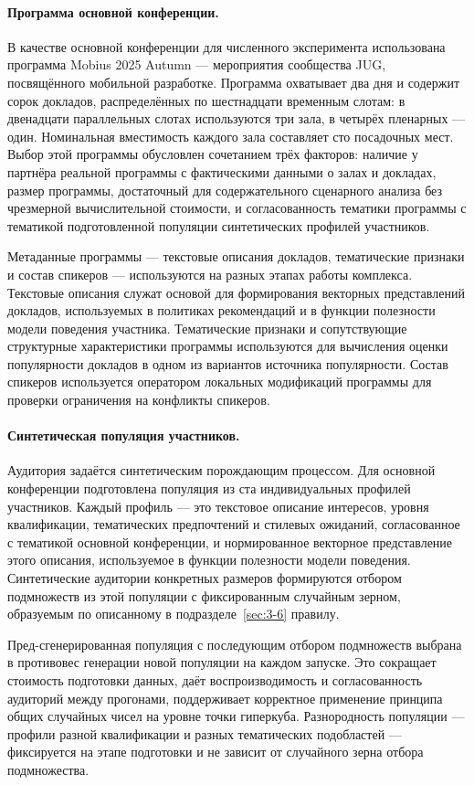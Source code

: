 \paragraph{Программа основной конференции.}
В качестве основной конференции для численного эксперимента использована программа Mobius 2025 Autumn --- мероприятия сообщества JUG, посвящённого мобильной разработке. Программа охватывает два дня и содержит сорок докладов, распределённых по шестнадцати временным слотам: в двенадцати параллельных слотах используются три зала, в четырёх пленарных --- один. Номинальная вместимость каждого зала составляет сто посадочных мест. Выбор этой программы обусловлен сочетанием трёх факторов: наличие у партнёра реальной программы с фактическими данными о залах и докладах, размер программы, достаточный для содержательного сценарного анализа без чрезмерной вычислительной стоимости, и согласованность тематики программы с тематикой подготовленной популяции синтетических профилей участников.

Метаданные программы --- текстовые описания докладов, тематические признаки и состав спикеров --- используются на разных этапах работы комплекса. Текстовые описания служат основой для формирования векторных представлений докладов, используемых в политиках рекомендаций и в функции полезности модели поведения участника. Тематические признаки и сопутствующие структурные характеристики программы используются для вычисления оценки популярности докладов в одном из вариантов источника популярности. Состав спикеров используется оператором локальных модификаций программы для проверки ограничения на конфликты спикеров.

\paragraph{Синтетическая популяция участников.}
Аудитория задаётся синтетическим порождающим процессом. Для основной конференции подготовлена популяция из ста индивидуальных профилей участников. Каждый профиль --- это текстовое описание интересов, уровня квалификации, тематических предпочтений и стилевых ожиданий, согласованное с тематикой основной конференции, и нормированное векторное представление этого описания, используемое в функции полезности модели поведения. Синтетические аудитории конкретных размеров формируются отбором подмножеств из этой популяции с фиксированным случайным зерном, образуемым по описанному в подразделе~\ref{sec:3-6} правилу.

Пред-сгенерированная популяция с последующим отбором подмножеств выбрана в противовес генерации новой популяции на каждом запуске. Это сокращает стоимость подготовки данных, даёт воспроизводимость и согласованность аудиторий между прогонами, поддерживает корректное применение принципа общих случайных чисел на уровне точки гиперкуба. Разнородность популяции --- профили разной квалификации и разных тематических подобластей --- фиксируется на этапе подготовки и не зависит от случайного зерна отбора подмножества.


